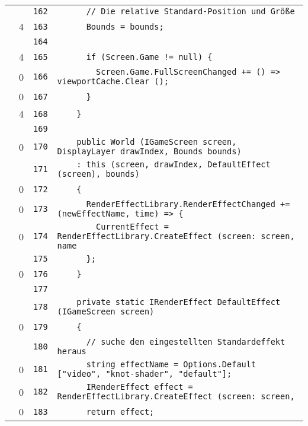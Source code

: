 \documentclass[a4paper,10pt]{article}
\begin{document}
\begin{longtable}[l]{lrrl}
\cellcolor{gray} &  & \verb~162~ & \verb~      // Die relative Standard-Position und Größe~\\
\cellcolor{green} & 4 & \verb~163~ & \verb~      Bounds = bounds;~\\
\cellcolor{gray} &  & \verb~164~ & \verb~~\\
\cellcolor{green} & 4 & \verb~165~ & \verb~      if (Screen.Game != null) {~\\
\cellcolor{red} & 0 & \verb~166~ & \verb~        Screen.Game.FullScreenChanged += () => viewportCache.Clear ();~\\
\cellcolor{red} & 0 & \verb~167~ & \verb~      }~\\
\cellcolor{green} & 4 & \verb~168~ & \verb~    }~\\
\cellcolor{gray} &  & \verb~169~ & \verb~~\\
\cellcolor{red} & 0 & \verb~170~ & \verb~    public World (IGameScreen screen, DisplayLayer drawIndex, Bounds bounds)~\\
\cellcolor{gray} &  & \verb~171~ & \verb~    : this (screen, drawIndex, DefaultEffect (screen), bounds)~\\
\cellcolor{red} & 0 & \verb~172~ & \verb~    {~\\
\cellcolor{red} & 0 & \verb~173~ & \verb~      RenderEffectLibrary.RenderEffectChanged += (newEffectName, time) => {~\\
\cellcolor{red} & 0 & \verb~174~ & \verb~        CurrentEffect = RenderEffectLibrary.CreateEffect (screen: screen, name~\\
\cellcolor{gray} &  & \verb~175~ & \verb~      };~\\
\cellcolor{red} & 0 & \verb~176~ & \verb~    }~\\
\cellcolor{gray} &  & \verb~177~ & \verb~~\\
\cellcolor{gray} &  & \verb~178~ & \verb~    private static IRenderEffect DefaultEffect (IGameScreen screen)~\\
\cellcolor{red} & 0 & \verb~179~ & \verb~    {~\\
\cellcolor{gray} &  & \verb~180~ & \verb~      // suche den eingestellten Standardeffekt heraus~\\
\cellcolor{red} & 0 & \verb~181~ & \verb~      string effectName = Options.Default ["video", "knot-shader", "default"];~\\
\cellcolor{red} & 0 & \verb~182~ & \verb~      IRenderEffect effect = RenderEffectLibrary.CreateEffect (screen: screen,~\\
\cellcolor{red} & 0 & \verb~183~ & \verb~      return effect;~\\

\end{longtable}
\end{document}
